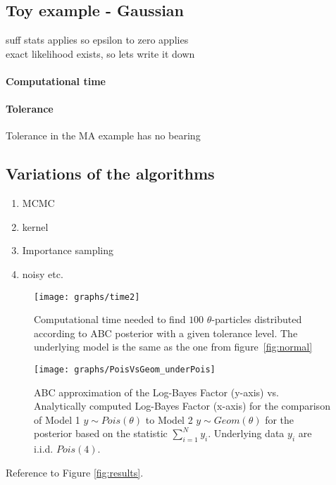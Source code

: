 \documentclass[fleqn,10pt]{SelfArx} %
\begin{document}
\subsection{Toy example - Gaussian}

suff stats applies so epsilon to zero applies\\
exact likelihood exists, so lets write it down\\
\paragraph{Computational time} \lipsum[7] %
\paragraph{Tolerance} \lipsum[8] %
Tolerance in the MA example has no bearing

\subsection{Variations of the algorithms}
\begin{enumerate}[noitemsep] %
\item MCMC
\item kernel
\item Importance sampling
\item noisy etc.
\end{enumerate}

\begin{figure}[ht]\centering
\texttt{[image: graphs/time2]}
\caption{Computational time needed to find $100$ $\theta$-particles distributed according to ABC posterior with a given tolerance level. The underlying model is the same as the one from figure~\ref{fig:normal}}
\label{fig:time}
\end{figure}

\begin{figure}[ht]\centering
\texttt{[image: graphs/PoisVsGeom\_underPois]}
\caption{ABC approximation of the Log-Bayes Factor (y-axis) vs. Analytically computed Log-Bayes Factor (x-axis) for the comparison of Model 1 $y\sim Pois(\theta)$ to Model 2 $y\sim Geom(\theta)$ for the posterior based on the statistic $\sum_{i=1}^Ny_i$. Underlying data $y_i$ are i.i.d. $Pois(4)$.}
\label{fig:PoisGeom}
\end{figure}


Reference to Figure \ref{fig:results}.
\end{document}
